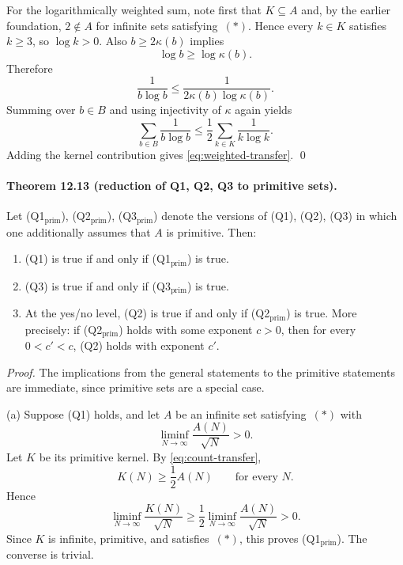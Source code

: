 For the logarithmically weighted sum, note first that $K\subseteq A$ and, by the earlier foundation, $2\notin A$ for infinite sets satisfying~$(*)$.
Hence every $k\in K$ satisfies $k\ge 3$, so $\log k>0$.
Also $b\ge 2\kappa(b)$ implies
\[
\log b\ge \log \kappa(b).
\]
Therefore
\[
\frac1{b\log b}
\le \frac1{2\kappa(b)\log \kappa(b)}.
\]
Summing over $b\in B$ and using injectivity of $\kappa$ again yields
\[
\sum_{b\in B}\frac1{b\log b}
\le \frac12\sum_{k\in K}\frac1{k\log k}.
\]
Adding the kernel contribution gives \eqref{eq:weighted-transfer}.
\qed

\bigskip

\paragraph{\textbf{Theorem 12.13 (reduction of Q1, Q2, Q3 to primitive sets).}}
Let \textnormal{(Q1$_{\mathrm{prim}}$)}, \textnormal{(Q2$_{\mathrm{prim}}$)}, \textnormal{(Q3$_{\mathrm{prim}}$)} denote the versions of \textnormal{(Q1)}, \textnormal{(Q2)}, \textnormal{(Q3)} in which one additionally assumes that $A$ is primitive.
Then:
\begin{enumerate}
\item[(a)] \textnormal{(Q1)} is true if and only if \textnormal{(Q1$_{\mathrm{prim}}$)} is true.
\item[(b)] \textnormal{(Q3)} is true if and only if \textnormal{(Q3$_{\mathrm{prim}}$)} is true.
\item[(c)] At the yes/no level, \textnormal{(Q2)} is true if and only if \textnormal{(Q2$_{\mathrm{prim}}$)} is true.
More precisely: if \textnormal{(Q2$_{\mathrm{prim}}$)} holds with some exponent $c>0$, then for every $0<c'<c$, \textnormal{(Q2)} holds with exponent $c'$.
\end{enumerate}

\emph{Proof.}
The implications from the general statements to the primitive statements are immediate, since primitive sets are a special case.

(a) Suppose \textnormal{(Q1)} holds, and let $A$ be an infinite set satisfying~$(*)$ with
\[
\liminf_{N\to\infty}\frac{A(N)}{\sqrt N}>0.
\]
Let $K$ be its primitive kernel.
By \eqref{eq:count-transfer},
\[
K(N)\ge \frac12 A(N)
\qquad\text{for every }N.
\]
Hence
\[
\liminf_{N\to\infty}\frac{K(N)}{\sqrt N}
\ge \frac12 \liminf_{N\to\infty}\frac{A(N)}{\sqrt N}>0.
\]
Since $K$ is infinite, primitive, and satisfies~$(*)$, this proves \textnormal{(Q1$_{\mathrm{prim}}$)}.
The converse is trivial.


